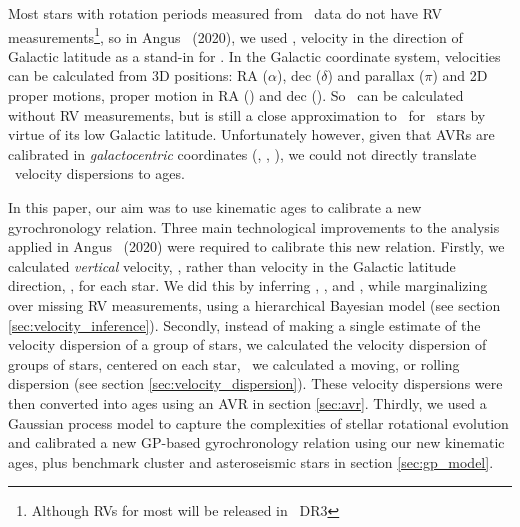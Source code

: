 Most stars with rotation periods measured from \kepler\ data do not have RV
measurements\footnote{Although RVs for most will be released in \gaia\ DR3},
so in Angus \etal\ (2020), we used \vb, velocity in the direction of Galactic
latitude as a stand-in for \vz.
In the Galactic coordinate system, velocities can be calculated from 3D
positions: RA ($\alpha$), dec ($\delta$) and parallax ($\pi$) and 2D proper
motions, proper motion in RA (\mura) and dec (\mudec).
So \vb\ can be calculated without RV measurements, but is still a close
approximation to \vz\ for \kepler\ stars by virtue of its low Galactic
latitude.
Unfortunately however, given that AVRs are calibrated in {\it galactocentric}
coordinates (\vx, \vy, \vz), we could not directly translate \vb\ velocity
dispersions to ages.

In this paper, our aim was to use kinematic ages to calibrate a new
gyrochronology relation.
Three main technological improvements to the analysis applied in Angus \etal\
(2020) were required to calibrate this new relation.
Firstly, we calculated {\it vertical} velocity, \vz, rather than velocity in
the Galactic latitude direction, \vb, for each star.
We did this by inferring \vx, \vy, and \vz, while marginalizing over missing
RV measurements, using a hierarchical Bayesian model (see section
\ref{sec:velocity_inference}).
Secondly, instead of making a single estimate of the velocity dispersion of a
group of stars, we calculated the velocity dispersion of groups of stars,
centered on each star, \ie\ we calculated a moving, or rolling dispersion (see
section \ref{sec:velocity_dispersion}).
These velocity dispersions were then converted into ages using an AVR
\citep{yu2019} in section \ref{sec:avr}.
Thirdly, we used a Gaussian process model to capture the complexities of
stellar rotational evolution and calibrated a new GP-based gyrochronology
relation using our new kinematic ages, plus benchmark cluster and
asteroseismic stars in section \ref{sec:gp_model}.
